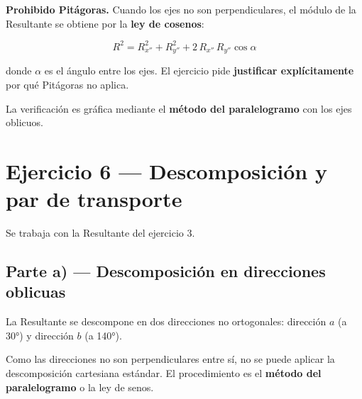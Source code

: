 \documentclass[
  spanish,
  11pt,
  a4paper,
]{article}
\begin{document}
\begin{tcolorbox}[enhanced jigsaw, bottomrule=.15mm, bottomtitle=1mm, titlerule=0mm, leftrule=.75mm, rightrule=.15mm, title=\textcolor{quarto-callout-warning-color}{\faExclamationTriangle}\hspace{0.5em}{Advertencia}, coltitle=black, colframe=quarto-callout-warning-color-frame, left=2mm, opacitybacktitle=0.6, opacityback=0, toptitle=1mm, toprule=.15mm, colbacktitle=quarto-callout-warning-color!10!white, colback=white, breakable, arc=.35mm]

\textbf{Prohibido Pitágoras.} Cuando los ejes no son perpendiculares, el
módulo de la Resultante se obtiene por la \textbf{ley de cosenos}:

\[R^2 = R_{x''}^2 + R_{y''}^2 + 2\,R_{x''}\,R_{y''}\cos\alpha\]

donde \(\alpha\) es el ángulo entre los ejes. El ejercicio pide
\textbf{justificar explícitamente} por qué Pitágoras no aplica.

\end{tcolorbox}

La verificación es gráfica mediante el \textbf{método del paralelogramo}
con los ejes oblicuos.

\section{Ejercicio 6 --- Descomposición y par de
transporte}\label{ejercicio-6-descomposiciuxf3n-y-par-de-transporte}

Se trabaja con la Resultante del ejercicio 3.

\subsection{Parte a) --- Descomposición en direcciones
oblicuas}\label{parte-a-descomposiciuxf3n-en-direcciones-oblicuas}

La Resultante se descompone en dos direcciones no ortogonales: dirección
\(a\) (a 30°) y dirección \(b\) (a 140°).

\begin{tcolorbox}[enhanced jigsaw, bottomrule=.15mm, bottomtitle=1mm, titlerule=0mm, leftrule=.75mm, rightrule=.15mm, title=\textcolor{quarto-callout-note-color}{\faInfo}\hspace{0.5em}{Nota}, coltitle=black, colframe=quarto-callout-note-color-frame, left=2mm, opacitybacktitle=0.6, opacityback=0, toptitle=1mm, toprule=.15mm, colbacktitle=quarto-callout-note-color!10!white, colback=white, breakable, arc=.35mm]

Como las direcciones no son perpendiculares entre sí, no se puede
aplicar la descomposición cartesiana estándar. El procedimiento es el
\textbf{método del paralelogramo} o la ley de senos.

\end{tcolorbox}
\end{document}
